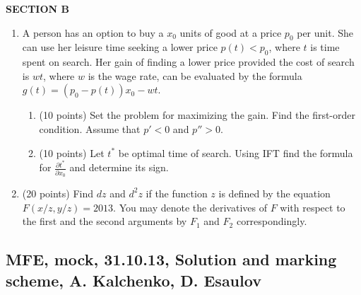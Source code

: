 \documentclass[12pt]{article} %
\theoremstyle{definition} %
\begin{document}
\textbf{SECTION B}

\begin{enumerate}[resume]
\item A person has an option to buy a $x_0$ units of good at a price $p_0$ per unit. She can use her leisure time seeking a lower price $p(t)<p_0$, where $t$ is time spent on search. Her gain of finding a lower price provided the cost of search is $wt$, where $w$ is the wage rate, can be evaluated by the formula $g(t)=(p_0-p(t))x_0-wt$.
\begin{enumerate}
\item (10 points) Set the problem for maximizing the gain. Find the first-order condition. Assume that  $p'<0$ and $p''>0$.
\item (10 points) Let $t^*$ be optimal time of search. Using IFT find the formula for $\frac{\partial t^*}{\partial x_0}$ and determine its sign.
\end{enumerate}

\item (20 points) Find $dz$ and $d^2z$ if the function $z$ is defined by the equation $F(x/z,y/z)=2013$. You may denote the derivatives of $F$ with respect to the first and the second arguments by $F_1$ and $F_2$ correspondingly.



\end{enumerate}



\subsection{MFE, mock, 31.10.13, Solution and marking scheme, A. Kalchenko, D. Esaulov}
\end{document}
